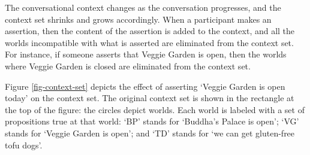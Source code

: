 The conversational context changes as the conversation progresses, and the context set shrinks and grows accordingly.  When a participant makes an assertion, then the content of the assertion is added to the context, and all the worlds incompatible with what is asserted are eliminated from the context set.  For instance, if someone asserts that Veggie Garden is open, then the worlds where Veggie Garden is closed are eliminated from the context set.

Figure \ref{fig-context-set} depicts the effect of asserting `Veggie Garden is open today' on the context set.  The original context set is shown in the rectangle at the top of the figure: the circles depict worlds.  Each world is labeled with a set of propositions true at that world: `BP' stands for `Buddha's Palace is open'; `VG' stands for `Veggie Garden is open'; and `TD' stands for `we can get gluten-free tofu dogs'.

